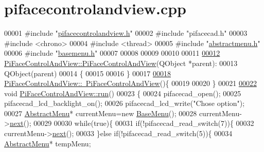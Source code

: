\hypertarget{pifacecontrolandview_8cpp_source}{}\section{pifacecontrolandview.\+cpp}
\label{pifacecontrolandview_8cpp_source}

\begin{DoxyCode}
00001 \textcolor{preprocessor}{#include "\hyperlink{pifacecontrolandview_8h}{pifacecontrolandview.h}"}
00002 \textcolor{preprocessor}{#include "pifacecad.h"}
00003 \textcolor{preprocessor}{#include <chrono>}
00004 \textcolor{preprocessor}{#include <thread>}
00005 \textcolor{preprocessor}{#include "\hyperlink{abstractmenu_8h}{abstractmenu.h}"}
00006 \textcolor{preprocessor}{#include "\hyperlink{basemenu_8h}{basemenu.h}"}
00007 
00008 
00009 
00010 
00011 
\hypertarget{pifacecontrolandview_8cpp_source.tex_l00012}{}\hyperlink{classPiFaceControlAndView_aaf210318d47c72e1262372662c554c25}{00012}  \hyperlink{classPiFaceControlAndView_aaf210318d47c72e1262372662c554c25}{PiFaceControlAndView::PiFaceControlAndView}(QObject *parent):
00013     QObject(parent)
00014 \{
00015 
00016 \}
00017 
\hypertarget{pifacecontrolandview_8cpp_source.tex_l00018}{}\hyperlink{classPiFaceControlAndView_aeb3977adb33eddb01288de16cffc1730}{00018} \hyperlink{classPiFaceControlAndView_aeb3977adb33eddb01288de16cffc1730}{PiFaceControlAndView::~PiFaceControlAndView}()\{
00019 
00020 \}
00021 
\hypertarget{pifacecontrolandview_8cpp_source.tex_l00022}{}\hyperlink{classPiFaceControlAndView_a5463b09284910cea9db7997f59b5345a}{00022} \textcolor{keywordtype}{void} \hyperlink{classPiFaceControlAndView_a5463b09284910cea9db7997f59b5345a}{PiFaceControlAndView::run}()
00023 \{
00024     pifacecad\_open();
00025     pifacecad\_lcd\_backlight\_on();
00026     pifacecad\_lcd\_write(\textcolor{stringliteral}{"Chose option"});
00027     \hyperlink{classAbstractMenu}{AbstractMenu}* currentMenu=\textcolor{keyword}{new} \hyperlink{classBaseMenu}{BaseMenu}();
00028     currentMenu->\hyperlink{classAbstractMenu_afc9ee4bf101f2761b4e8e083ef3c4a9b}{next}();
00029 
00030     \textcolor{keywordflow}{while}(\textcolor{keyword}{true})\{
00031         \textcolor{keywordflow}{if}(!pifacecad\_read\_switch(7))\{
00032             currentMenu->\hyperlink{classAbstractMenu_afc9ee4bf101f2761b4e8e083ef3c4a9b}{next}();
00033         \}\textcolor{keywordflow}{else} \textcolor{keywordflow}{if}(!pifacecad\_read\_switch(5))\{
00034             \hyperlink{classAbstractMenu}{AbstractMenu}* tempMenu;

\end{DoxyCode}
